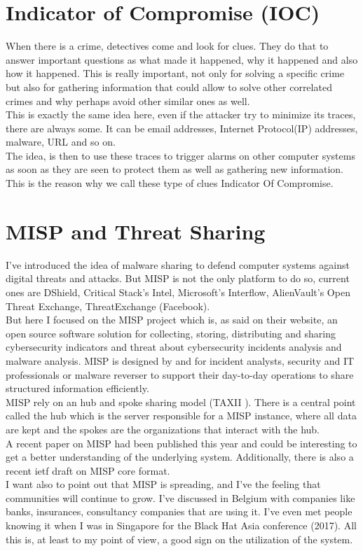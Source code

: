 \documentclass{eplmastersthesis}
\begin{document}
\section{Indicator of Compromise (IOC)}
When there is a crime, detectives come and look for clues. They do that to answer important questions as what made it happened, why it happened and also how it happened. This is really important, not only for solving a specific crime but also for gathering information that could allow to solve other correlated crimes and why perhaps avoid other similar ones as well.\\
This is exactly the same idea here, even if the attacker try to minimize its traces, there are always some. It can be email addresses, Internet Protocol(IP) addresses, malware, URL and so on.\\
The idea, is then to use these traces to trigger alarms on other computer systems as soon as they are seen to protect them as well as gathering new information. This is the reason why we call these type of clues Indicator Of Compromise.


\section{MISP and Threat Sharing}
I've introduced the idea of malware sharing to defend computer systems against digital threats and attacks. But MISP is not the only platform to do so, current ones are DShield, Critical Stack’s Intel, Microsoft’s Interflow, AlienVault’s Open Threat Exchange, ThreatExchange (Facebook).\\
But here I focused on the MISP project which is, as said on their website, an open source software solution for collecting, storing, distributing and sharing cybersecurity indicators and threat about cybersecurity incidents analysis and malware analysis. MISP is designed by and for incident analysts, security and IT professionals or malware reverser to support their day-to-day operations to share structured information efficiently.\\
MISP rely on an hub and spoke sharing model (TAXII \cite{taxiiWebsite}). There is a central point called the hub which is the server responsible for a MISP instance, where all data are kept and the spokes are the organizations that interact with the hub.\\
A recent paper on MISP \cite{wagner2016misp} had been published this year and could be interesting to get a better understanding of the underlying system. Additionally, there is also a recent ietf draft on MISP core format\cite{MispDraft}.\\
I want also to point out that MISP is spreading, and I've the feeling that communities will continue to grow. I've discussed in Belgium with companies like banks, insurances, consultancy companies that are using it. I've even met people knowing it when I was in Singapore for the Black Hat Asia conference (2017). All this is, at least to my point of view, a good sign on the utilization of the system.
\end{document}
